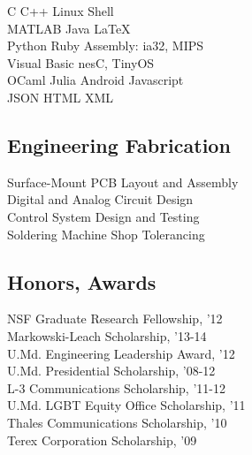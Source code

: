 \documentclass[letterpaper]{deedy-resume} %
\begin{document}
\begin{minipage}[t]{0.33\textwidth}
C \textbullet{} C++ \textbullet{} Linux Shell \\ 
MATLAB \textbullet{} Java \textbullet{} \LaTeX \\
Python \textbullet{} Ruby \textbullet{} Assembly: ia32, MIPS \\
Visual Basic \textbullet{} nesC, TinyOS\\
OCaml \textbullet{} Julia \textbullet{} Android \textbullet{} Javascript \\
JSON \textbullet{} HTML \textbullet{} XML\\

\sectionspace

\subsection{Engineering Fabrication}

Surface-Mount PCB Layout and Assembly\\
Digital and Analog Circuit Design\\
Control System Design and Testing\\
Soldering \textbullet{} Machine Shop \textbullet{} Tolerancing\\


\sectionspace %

\subsection{Honors, Awards}

NSF Graduate Research Fellowship, '12\\
Markowski-Leach Scholarship, '13-14\\
U.Md. Engineering Leadership Award, '12\\
U.Md. Presidential Scholarship, '08-12\\
L-3 Communications Scholarship, '11-12\\
U.Md. LGBT Equity Office Scholarship, '11\\
Thales Communications Scholarship, '10\\
Terex Corporation Scholarship, '09\\


\end{minipage}%
\hfill
%
%
\end{document}
